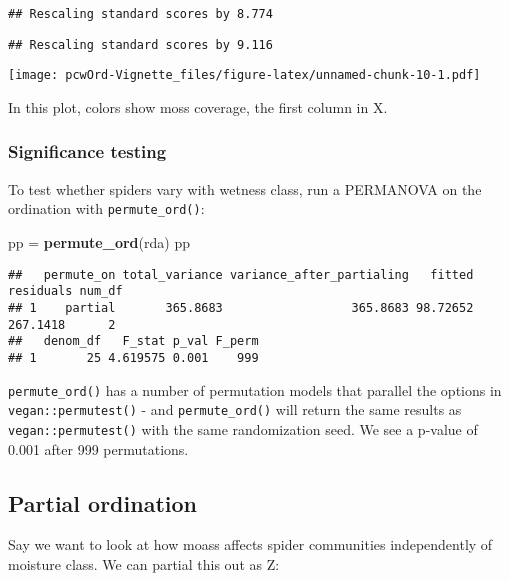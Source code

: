 \documentclass[
]{article}
\newenvironment{Shaded}{\begin{snugshade}}{\end{snugshade}}
\newcommand{\KeywordTok}[1]{\textcolor[rgb]{0.13,0.29,0.53}{\textbf{#1}}}
\newcommand{\NormalTok}[1]{#1}
\newcommand{\StringTok}[1]{\textcolor[rgb]{0.31,0.60,0.02}{#1}}
\begin{document}
\begin{verbatim}
## Rescaling standard scores by 8.774
\end{verbatim}

\begin{verbatim}
## Rescaling standard scores by 9.116
\end{verbatim}

\texttt{[image: pcwOrd-Vignette\_files/figure-latex/unnamed-chunk-10-1.pdf]}

In this plot, colors show moss coverage, the first column in X.

\hypertarget{significance-testing}{%
\subsubsection{Significance testing}\label{significance-testing}}

To test whether spiders vary with wetness class, run a PERMANOVA on the
ordination with \texttt{permute\_ord()}:

\begin{Shaded}
\begin{Highlighting}[]
\NormalTok{pp =}\StringTok{ }\KeywordTok{permute_ord}\NormalTok{(rda)}
\NormalTok{pp}
\end{Highlighting}
\end{Shaded}

\begin{verbatim}
##   permute_on total_variance variance_after_partialing   fitted residuals num_df
## 1    partial       365.8683                  365.8683 98.72652  267.1418      2
##   denom_df   F_stat p_val F_perm
## 1       25 4.619575 0.001    999
\end{verbatim}

\texttt{permute\_ord()} has a number of permutation models that parallel
the options in \texttt{vegan::permutest()} - and \texttt{permute\_ord()}
will return the same results as \texttt{vegan::permutest()} with the
same randomization seed. We see a p-value of 0.001 after 999
permutations.

\hypertarget{partial-ordination}{%
\subsection{Partial ordination}\label{partial-ordination}}

Say we want to look at how moass affects spider communities
independently of moisture class. We can partial this out as Z:
\end{document}
